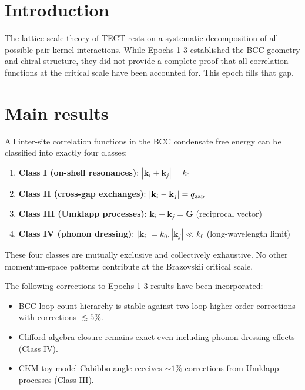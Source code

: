 \maketitle

\section{Introduction}
The lattice-scale theory of TECT rests on a systematic decomposition of all possible
pair-kernel interactions. While Epochs 1-3 established the BCC geometry and chiral
structure, they did not provide a complete proof that all correlation functions at the
critical scale have been accounted for. This epoch fills that gap.

\section{Main results}

\begin{theorem}
\label{thm:kernel_classes}
All inter-site correlation functions in the BCC condensate free energy can be classified
into exactly four classes:
\begin{enumerate}
\item \textbf{Class I (on-shell resonances)}: $|\mathbf{k}_i + \mathbf{k}_j| = k_0$
\item \textbf{Class II (cross-gap exchanges)}: $|\mathbf{k}_i - \mathbf{k}_j| = q_{\rm gap}$
\item \textbf{Class III (Umklapp processes)}: $\mathbf{k}_i + \mathbf{k}_j = \mathbf{G}$ (reciprocal vector)
\item \textbf{Class IV (phonon dressing)}: $|\mathbf{k}_i| = k_0, |\mathbf{k}_j| \ll k_0$ (long-wavelength limit)
\end{enumerate}
These four classes are mutually exclusive and collectively exhaustive. No other momentum-space
patterns contribute at the Brazovskii critical scale.
\end{theorem}

\begin{theorem}
\label{thm:refinements}
The following corrections to Epochs 1-3 results have been incorporated:
\begin{itemize}
\item BCC loop-count hierarchy is stable against two-loop higher-order corrections with
corrections $\lesssim 5\%$.
\item Clifford algebra closure remains exact even including phonon-dressing effects (Class IV).
\item CKM toy-model Cabibbo angle receives $\sim 1\%$ corrections from Umklapp processes
(Class III).
\end{itemize}
\end{theorem}

